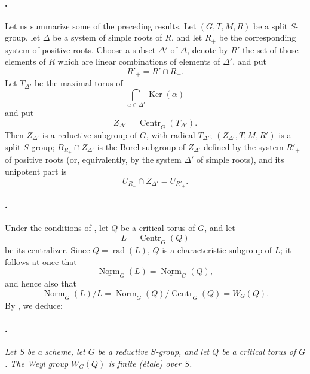 \paragraph{.}
Let us summarize some of the preceding results. Let
\((G,T,M,R)\) be a split \(S\)-group, let \(\Delta\) be a system
of simple roots of \(R\), and let \(R_+\) be the corresponding
system of positive roots. Choose a subset \(\Delta'\) of
\(\Delta\), denote by \(R'\) the set of those elements of \(R\)
which are linear combinations of elements of \(\Delta'\), and put
\[
  R'_+=R'\cap R_+.
\]
Let \(T_{\Delta'}\) be the maximal torus of
\[
  \bigcap_{\alpha\in\Delta'}\operatorname{Ker}(\alpha)
\]
and put
\[
  Z_{\Delta'}
  =
  \underline{\operatorname{Centr}}_G(T_{\Delta'}).
\]
Then \(Z_{\Delta'}\) is a reductive subgroup of \(G\), with radical
\(T_{\Delta'}\); \((Z_{\Delta'},T,M,R')\) is a split
\(S\)-group; \(B_{R_+}\cap Z_{\Delta'}\) is the Borel subgroup of
\(Z_{\Delta'}\) defined by the system \(R'_+\) of positive roots
\textup{(or, equivalently, by the system \(\Delta'\) of simple
roots)}, and its unipotent part is
\[
  U_{R_+}\cap Z_{\Delta'}=U_{R'_+}.
\]

\paragraph{.}
Under the conditions of , let \(Q\) be a critical torus of
\(G\), and let
\[
  L=\underline{\operatorname{Centr}}_G(Q)
\]
be its centralizer. Since \(Q=\operatorname{rad}(L)\), \(Q\) is a
characteristic subgroup of \(L\); it follows at once that
\[
  \underline{\operatorname{Norm}}_G(L)
  =
  \underline{\operatorname{Norm}}_G(Q),
\]
and hence also that
\[
  \underline{\operatorname{Norm}}_G(L)/L
  =
  \underline{\operatorname{Norm}}_G(Q)/
  \underline{\operatorname{Centr}}_G(Q)
  =
  W_G(Q).
\]
By , we deduce:

\paragraph{.}
{\itshape Let \(S\) be a scheme, let \(G\) be a reductive
\(S\)-group, and let \(Q\) be a critical torus of \(G\). The Weyl
group \(W_G(Q)\) is finite \textup{(étale)} over \(S\).}

